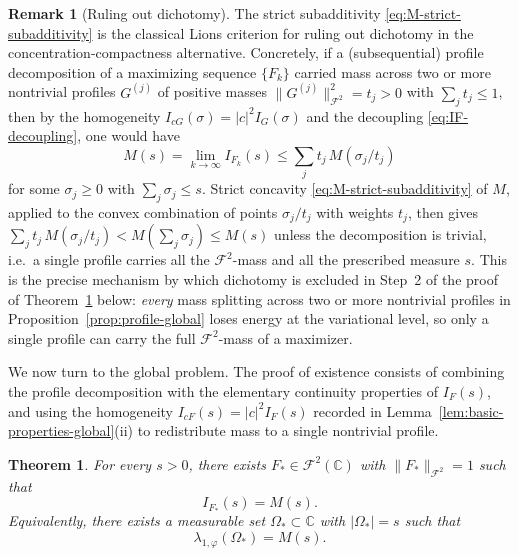 \documentclass[a4paper,11pt,reqno]{amsart}
\numberwithin{equation}{section}
\theoremstyle{plain} %
\newtheorem{theorem}{Theorem}
\theoremstyle{definition} %
\newtheorem{remark}{Remark}[section]
\theoremstyle{remark}
\newcommand{\C}{\mathbb{C}}
\begin{document}
\begin{remark}[Ruling out dichotomy]\label{rmk:no-dichotomy}
The strict subadditivity \eqref{eq:M-strict-subadditivity} is the
classical Lions criterion for ruling out dichotomy in the
concentration-compactness alternative. Concretely, if a (subsequential)
profile decomposition of a maximizing sequence \(\{F_k\}\) carried mass
across two or more nontrivial profiles \(G^{(j)}\) of positive masses
\(\|G^{(j)}\|_{\mathcal F^2}^2=t_j>0\) with \(\sum_j t_j\le 1\), then by
the homogeneity \(I_{cG}(\sigma)=|c|^2 I_G(\sigma)\) and the decoupling
\eqref{eq:IF-decoupling}, one would have
\[
M(s)=\lim_{k\to\infty}I_{F_k}(s)
\le \sum_j t_j\,M(\sigma_j/t_j)
\]
for some \(\sigma_j\ge 0\) with \(\sum_j \sigma_j\le s\). Strict
concavity \eqref{eq:M-strict-subadditivity} of \(M\), applied to the
convex combination of points \(\sigma_j/t_j\) with weights \(t_j\),
then gives \(\sum_j t_j\,M(\sigma_j/t_j)<M(\sum_j \sigma_j)\le M(s)\)
unless the decomposition is trivial, i.e.\ a single profile carries all
the \(\mathcal F^2\)-mass and all the prescribed measure \(s\). This is
the precise mechanism by which dichotomy is excluded in Step~2 of the
proof of Theorem~\ref{thm:existence-global-maximizer} below:
\emph{every} mass splitting across two or more nontrivial profiles in
Proposition~\ref{prop:profile-global} loses energy at the variational
level, so only a single profile can carry the full
\(\mathcal F^2\)-mass of a maximizer.
\end{remark}

We now turn to the global problem. The proof of existence consists of
combining the profile decomposition with the elementary continuity properties
of \(I_F(s)\), and using the homogeneity \(I_{cF}(s)=|c|^2 I_F(s)\) recorded
in Lemma~\ref{lem:basic-properties-global}(ii) to redistribute mass to a
single nontrivial profile.

\begin{theorem}\label{thm:existence-global-maximizer}
For every \(s>0\), there exists \(F_*\in \mathcal F^2(\C)\) with
\(\|F_*\|_{\mathcal F^2}=1\) such that
\[
I_{F_*}(s)=M(s).
\]
Equivalently, there exists a measurable set \(\Omega_*\subset \C\) with
\(|\Omega_*|=s\) such that
\[
\lambda_{1,\varphi}(\Omega_*)=M(s).
\]
\end{theorem}
\end{document}
